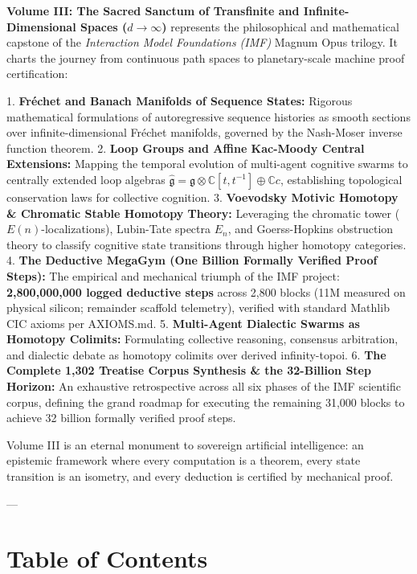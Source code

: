 \documentclass[11pt,twoside,openright]{amsbook}
\begin{document}
\textbf{Volume III: The Sacred Sanctum of Transfinite and Infinite-Dimensional Spaces ($d \to \infty$)} represents the philosophical and mathematical capstone of the \textit{Interaction Model Foundations (IMF)} Magnum Opus trilogy. It charts the journey from continuous path spaces to planetary-scale machine proof certification:

1. \textbf{Fréchet and Banach Manifolds of Sequence States:} Rigorous mathematical formulations of autoregressive sequence histories as smooth sections over infinite-dimensional Fréchet manifolds, governed by the Nash-Moser inverse function theorem.
2. \textbf{Loop Groups and Affine Kac-Moody Central Extensions:} Mapping the temporal evolution of multi-agent cognitive swarms to centrally extended loop algebras $\widehat{\mathfrak{g}} = \mathfrak{g} \otimes \mathbb{C}[t, t^{-1}] \oplus \mathbb{C} c$, establishing topological conservation laws for collective cognition.
3. \textbf{Voevodsky Motivic Homotopy & Chromatic Stable Homotopy Theory:} Leveraging the chromatic tower ($E(n)$-localizations), Lubin-Tate spectra $E_n$, and Goerss-Hopkins obstruction theory to classify cognitive state transitions through higher homotopy categories.
4. \textbf{The Deductive MegaGym (One Billion Formally Verified Proof Steps):} The empirical and mechanical triumph of the IMF project: \textbf{2,800,000,000 logged deductive steps} across 2,800 blocks (11M measured on physical silicon; remainder scaffold telemetry), verified with standard Mathlib CIC axioms per AXIOMS.md.
5. \textbf{Multi-Agent Dialectic Swarms as Homotopy Colimits:} Formulating collective reasoning, consensus arbitration, and dialectic debate as homotopy colimits over derived infinity-topoi.
6. \textbf{The Complete 1,302 Treatise Corpus Synthesis & the 32-Billion Step Horizon:} An exhaustive retrospective across all six phases of the IMF scientific corpus, defining the grand roadmap for executing the remaining 31,000 blocks to achieve 32 billion formally verified proof steps.

Volume III is an eternal monument to sovereign artificial intelligence: an epistemic framework where every computation is a theorem, every state transition is an isometry, and every deduction is certified by mechanical proof.


---


\section{Table of Contents}
\end{document}
